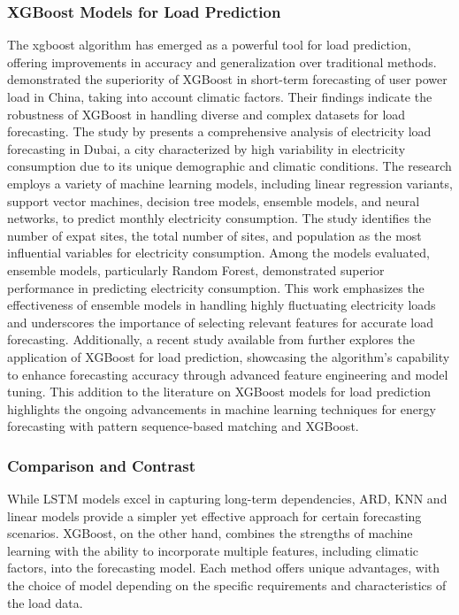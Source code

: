 \documentclass{article} %
\begin{document}
\subsubsection{XGBoost Models for Load Prediction}
The \gls{xgboost} algorithm has emerged as a powerful tool for load prediction, offering improvements in accuracy and generalization over traditional methods. \cite{cai2020short} demonstrated the superiority of XGBoost in short-term forecasting of user power load in China, taking into account climatic factors. Their findings indicate the robustness of XGBoost in handling diverse and complex datasets for load forecasting. The study by \citet{ABDALLAH2022101707} presents a comprehensive analysis of electricity load forecasting in Dubai, a city characterized by high variability in electricity consumption due to its unique demographic and climatic conditions. The research employs a variety of machine learning models, including linear regression variants, support vector machines, decision tree models, ensemble models, and neural networks, to predict monthly electricity consumption. The study identifies the number of expat sites, the total number of sites, and population as the most influential variables for electricity consumption. Among the models evaluated, ensemble models, particularly Random Forest, demonstrated superior performance in predicting electricity consumption. This work emphasizes the effectiveness of ensemble models in handling highly fluctuating electricity loads and underscores the importance of selecting relevant features for accurate load forecasting. Additionally, a recent study available from \cite{NIE2022117854} further explores the application of XGBoost for load prediction, showcasing the algorithm's capability to enhance forecasting accuracy through advanced feature engineering and model tuning. This addition to the literature on XGBoost models for load prediction highlights the ongoing advancements in machine learning techniques for energy forecasting with pattern sequence-based matching and XGBoost.



\subsubsection{Comparison and Contrast}
While LSTM models excel in capturing long-term dependencies, ARD, KNN and linear models provide a simpler yet effective approach for certain forecasting scenarios. XGBoost, on the other hand, combines the strengths of machine learning with the ability to incorporate multiple features, including climatic factors, into the forecasting model. Each method offers unique advantages, with the choice of model depending on the specific requirements and characteristics of the load data.
\end{document}
